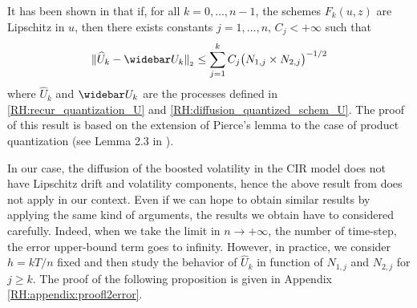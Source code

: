 

It has been shown in \cite{abbas2018product,sagna2018general} that if, for all $k=0, \dots, n-1$, the schemes $F_{k}(u,z)$ are Lipschitz in $u$, then there exists constants $j=1, \dots, n, \, C_j < + \infty$ such that
\begin{equation}
	\Vert \widehat U_k - \widebar U_k \Vert_{_2} \leq \sum_{j=1}^k C_j \big( N_{1,j} \times N_{2,j} \big)^{-1/2}
\end{equation}
where $\widehat U_k$ and $\widebar U_k$ are the processes defined in \eqref{RH:recur_quantization_U} and \eqref{RH:diffusion_quantized_schem_U}. The proof of this result is based on the extension of Pierce's lemma to the case of product quantization (see Lemma 2.3 in \cite{sagna2018general}).

\medskip
In our case, the diffusion of the boosted volatility in the CIR model does not have Lipschitz drift and volatility components, hence the above result from \cite{abbas2018product,sagna2018general} does not apply in our context. Even if we can hope to obtain similar results by applying the same kind of arguments, the results we obtain have to considered carefully. Indeed, when we take the limit in $n \rightarrow + \infty$, the number of time-step, the error upper-bound term goes to infinity. However, in practice, we consider $h = kT/n$ fixed and then study the behavior of $\widehat U_k$ in function of $N_{1,j}$ and $N_{2,j}$ for $j \geq k$. The proof of the following proposition is given in Appendix \ref{RH:appendix:proofl2error}.

